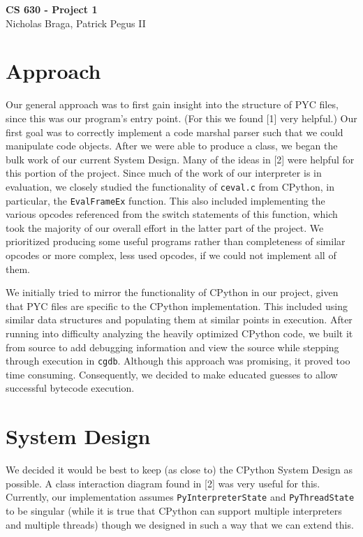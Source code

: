 \documentclass{article}
\begin{document}
\begin{center}
{\LARGE \bf CS 630 - Project 1}\\
\vspace*{0.1cm}
{\normalsize Nicholas Braga, Patrick Pegus II}
\end{center}

\section*{Approach}

Our general approach was to first gain insight into the structure of PYC files, since this was our program's entry point. (For this we found [1] very helpful.) Our first goal was to correctly implement a code marshal parser such that we could manipulate code objects. After we were able to produce a  class, we began the bulk work of our current System Design. Many of the ideas in [2] were helpful for this portion of the project. Since much of the work of our interpreter is in evaluation, we closely studied the functionality of \texttt{ceval.c} from CPython, in particular, the \texttt{EvalFrameEx} function.
This also included implementing the various opcodes referenced from the switch statements of this function, which took the majority of our overall effort in the latter part of the project. We prioritized producing some useful programs rather than completeness of similar opcodes or more complex, less used opcodes, if we could not implement all of them.

We initially tried to mirror the functionality of CPython in our project, given that PYC files are specific to the CPython implementation. This included using similar data structures and populating
them at similar points in execution. After running into difficulty analyzing the heavily optimized CPython code, we built it from source to add debugging information and view the source while stepping through execution
in \texttt{cgdb}. Although this approach was promising, it proved too time consuming. Consequently, we decided to make educated guesses to allow successful bytecode execution.

\section*{System Design}

We decided it would be best to keep (as close to) the CPython System Design as possible. A class interaction diagram found in [2] was very useful for this. Currently, our implementation assumes \texttt{PyInterpreterState} and \texttt{PyThreadState} to be singular (while it is true that CPython can support multiple interpreters and multiple threads) though we designed in such a way that we can extend this. 
\end{document}
